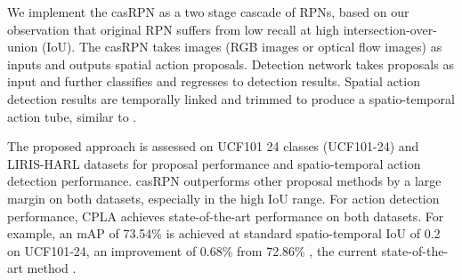 \documentclass{bmvc2k}
\begin{document}
We implement the casRPN as a two stage cascade of RPNs, based on our observation that original RPN suffers from low recall at high intersection-over-union (IoU). The casRPN takes images (RGB images or optical flow images) as inputs and outputs spatial action proposals. Detection network takes proposals as input and further classifies and regresses to detection results. Spatial action detection results are temporally linked and trimmed to produce a spatio-temporal action tube, similar to \cite{suman16bmvc,peng2016multi}.

The proposed approach is assessed on UCF101 \cite{soomro2012ucf101} 24 classes (UCF101-24) and LIRIS-HARL \cite{wolf2014evaluation} datasets for proposal performance and spatio-temporal action detection performance. casRPN outperforms other proposal methods \cite{uijlings2013selective,zitnick2014edge,ren2015faster} by a large margin on both datasets, especially in the high IoU range. For action detection performance, CPLA achieves state-of-the-art performance on both datasets. For example, an mAP of 73.54\% is achieved at standard spatio-temporal IoU of 0.2 on UCF101-24, an improvement of 0.68\% from 72.86\% , the current state-of-the-art method \cite{peng2016multi}. 




\end{document}
